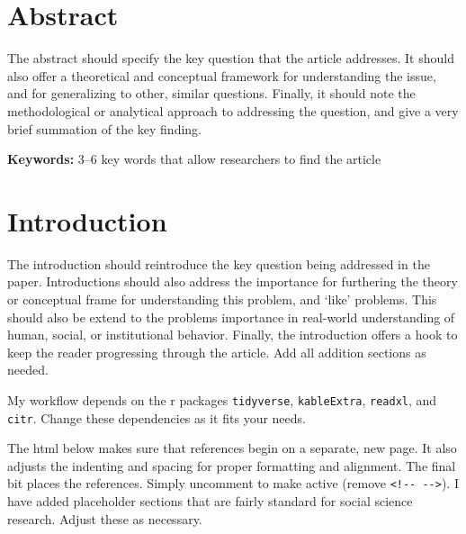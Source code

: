 \documentclass[
  12pt,
]{article}
\title{\sffamily{``Title''}}
\author{author one}
\author{author two}
\affil{affiliation one}
\affil{affiliation two}
\author{author one}
\author{author two}
\date{2021-05-23}
\begin{document}
\maketitle

\newpage

\hypertarget{Abstract}{%
\section*{Abstract}\label{Abstract}}

\noindent The abstract should specify the key question that the article addresses. It should also offer a theoretical and conceptual framework for understanding the issue, and for generalizing to other, similar questions. Finally, it should note the methodological or analytical approach to addressing the question, and give a very brief summation of the key finding.

\noindent \textbf{Keywords:} 3--6 key words that allow researchers to find the article

\newpage


\hypertarget{introduction}{%
\section*{Introduction}\label{introduction}}

The introduction should reintroduce the key question being addressed in the paper. Introductions should also address the importance for furthering the theory or conceptual frame for understanding this problem, and `like' problems. This should also be extend to the problems importance in real-world understanding of human, social, or institutional behavior. Finally, the introduction offers a hook to keep the reader progressing through the article. Add all addition sections as needed.

My workflow depends on the r packages \texttt{tidyverse}, \texttt{kableExtra}, \texttt{readxl}, and \texttt{citr}. Change these dependencies as it fits your needs.

The html below makes sure that references begin on a separate, new page. It also adjusts the indenting and spacing for proper formatting and alignment. The final bit places the references. Simply uncomment to make active (remove \texttt{\textless{}!-\/-\ -\/-\textgreater{}}). I have added placeholder sections that are fairly standard for social science research. Adjust these as necessary.
\end{document}

